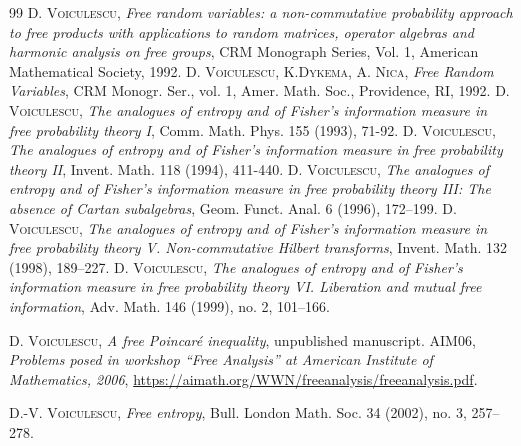 \documentclass[10pt,a4paper,reqno]{amsart}
\begin{document}
\begin{thebibliography}{99}
\textsc{D. Voiculescu}, 
\textit{Free random variables: a non-commutative probability approach to free products with applications to random matrices, operator algebras and harmonic analysis on free groups}, 
CRM Monograph Series, Vol. 1, American Mathematical Society, 1992.
\textsc{D. Voiculescu, K.Dykema, A. Nica}, \textit{Free Random Variables}, 
CRM Monogr. Ser., vol. 1, Amer. Math. Soc.,
Providence, RI, 1992.
\textsc{D. Voiculescu}, 
\textit{The analogues of entropy and of Fisher’s information measure in free probability theory I}, 
Comm. Math. Phys. 155 (1993), 71-92.
\textsc{D. Voiculescu}, 
\textit{The analogues of entropy and of Fisher’s information measure in free probability theory II}, 
Invent. Math. 118 (1994), 411-440.
\textsc{D. Voiculescu}, 
\textit{The analogues of entropy and of Fisher’s information measure in free probability theory III: The absence of Cartan subalgebras}, 
Geom. Funct. Anal. 6 (1996), 172–199.
\textsc{D. Voiculescu}, 
\textit{The analogues of entropy and of Fisher’s information measure in free probability theory V. Non-commutative Hilbert transforms}, 
Invent. Math. 132 (1998), 189–227.
\textsc{D. Voiculescu}, 
\textit{The analogues of entropy and of Fisher’s information measure in free probability theory VI. Liberation and mutual free information}, 
Adv. Math. 146 (1999), no. 2, 101–166.

\textsc{D. Voiculescu}, 
\textit{A free Poincaré inequality}, 
unpublished manuscript.
\textsc{AIM06},
\textit{Problems posed in workshop “Free Analysis” at American Institute of Mathematics, 2006}, \url{https://aimath.org/WWN/freeanalysis/freeanalysis.pdf}.

\textsc{D.-V. Voiculescu}, 
\textit{Free entropy}, 
Bull. London Math. Soc. 34 (2002), no. 3, 257–278.


\end{thebibliography}
\end{document}
